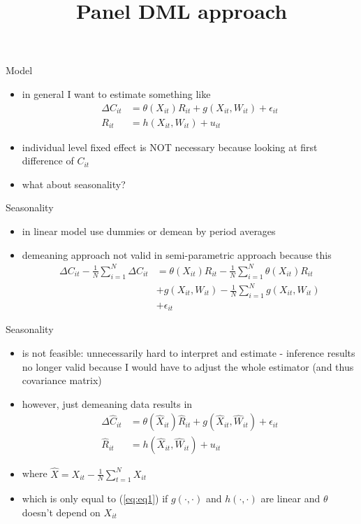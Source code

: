 \documentclass[a4paper, 12pt]{beamer}
\title{Panel DML approach}
\author{}
\date{}
\begin{document}
\begin{frame}{Model}
\begin{itemize}
    \item in general I want to estimate something like
    \begin{align*}
        \Delta C_{it}&=\theta(X_{it})R_{it} + g(X_{it}, W_{it}) + \epsilon_{it} \\
        R_{it}&=h(X_{it}, W_{it}) + u_{it}
    \end{align*}
    \item individual level fixed effect is NOT necessary because looking at first difference of $C_{it}$ 
    \item what about seasonality?
\end{itemize}
\end{frame}

\begin{frame}{Seasonality}
\begin{itemize}
    \item in linear model use dummies or demean by period averages 
    \item demeaning approach not valid in semi-parametric approach because this
    \begin{align}\label{eq:eq1}
        \Delta C_{it}-\frac{1}{N}\sum_{i=1}^{N}\Delta C_{it}&=\theta(X_{it})R_ {it}-\frac{1}{N}\sum_{i=1}^{N}\theta(X_{it})R_{it} \nonumber \\ 
        &+g(X_{it}, W_{it})-\frac{1}{N}\sum_{i=1}^{N}g(X_{it}, W_{it}) \\
        &+\epsilon_{it} \nonumber
    \end{align}
\end{itemize}
\end{frame}

\begin{frame}{Seasonality}
\begin{itemize}
    \item is not feasible: unnecessarily hard to interpret and estimate - inference results no longer valid because I would have to adjust the whole estimator (and thus covariance matrix)
    \item however, just demeaning data results in 
    \begin{align*}
        \Delta \hat{C}_{it}&=\theta(\hat{X}_{it})\hat{R}_{it} + g(\hat{X}_{it}, \hat{W}_{it}) + \epsilon_{it} \\
        \hat{R}_{it}&=h(\hat{X}_{it}, \hat{W}_{it}) + u_{it}        
    \end{align*}
    \item where $\hat{X}=X_{it}-\frac{1}{N}\sum_{t=1}^{N}X_{it}$
    \item which is only equal to (\ref{eq:eq1}) if $g(\cdot, \cdot)$ and $h(\cdot, \cdot)$ are linear and $\theta$ doesn't depend on $X_{it}$
\end{itemize}
\end{frame}
\end{document}
